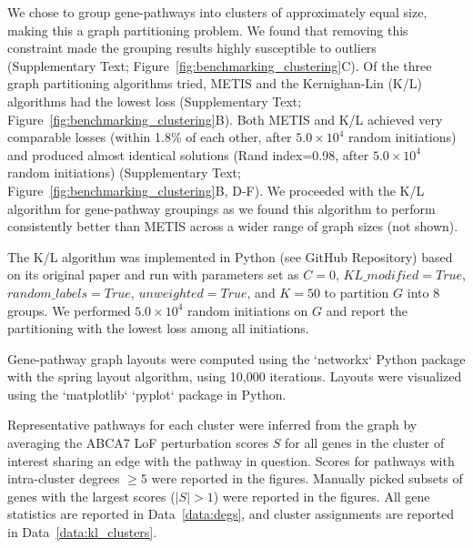 \documentclass[12pt]{article}
\begin{document}
We chose to group gene-pathways into clusters of approximately equal size, making this a graph partitioning problem. We found that removing this constraint made the grouping results highly susceptible to outliers (Supplementary Text; Figure~\ref{fig:benchmarking_clustering}C). Of the three graph partitioning algorithms tried, METIS and the Kernighan-Lin (K/L) algorithms had the lowest loss (Supplementary Text; Figure~\ref{fig:benchmarking_clustering}B). Both METIS and K/L achieved very comparable losses (within 1.8\% of each other, after $5.0 \times 10^4$ random initiations) and produced almost identical solutions (Rand index=0.98, after $5.0 \times 10^4$ random initiations) (Supplementary Text; Figure~\ref{fig:benchmarking_clustering}B, D-F). We proceeded with the K/L algorithm for gene-pathway groupings as we found this algorithm to perform consistently better than METIS across a wider range of graph sizes (not shown).

The K/L algorithm was implemented in Python (see GitHub Repository) based on its original paper \cite{Kernighan1970-zl} and run with parameters set as $C=0$, $KL\_modified=True$, $random\_labels=True$, $unweighted=True$, and $K=50$ to partition $G$ into 8 groups. We performed $5.0 \times 10^4$ random initiations on $G$ and report the partitioning with the lowest loss among all initiations.

Gene-pathway graph layouts were computed using the `networkx` Python package with the spring layout algorithm, using 10,000 iterations. Layouts were visualized using the `matplotlib` `pyplot` package in Python. 

Representative pathways for each cluster were inferred from the graph by averaging the ABCA7 LoF perturbation scores $S$ for all genes in the cluster of interest sharing an edge with the pathway in question. Scores for pathways with intra-cluster degrees $\geq 5$ were reported in the figures. Manually picked subsets of genes with the largest scores ($|S| > 1$) were reported in the figures. All gene statistics are reported in Data~\ref{data:degs}, and cluster assignments are reported in Data~\ref{data:kl_clusters}.
\end{document}
